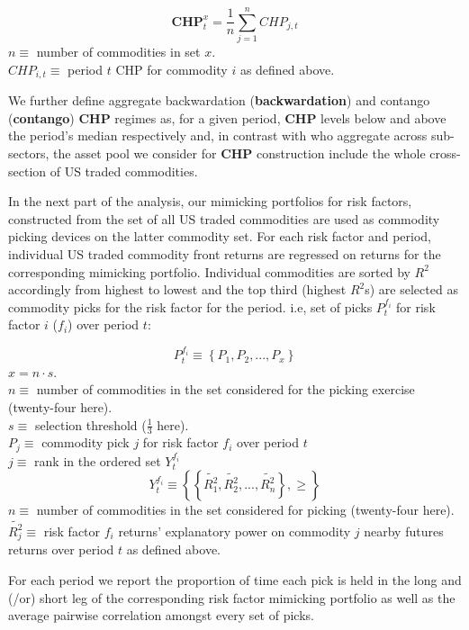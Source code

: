 \documentclass[
  authoryear,
  preprint,
  3p]{elsarticle}
\begin{document}
\[\mathbf{CHP}_{t}^{x}=\frac{1}{n}\sum_{j=1}^{n}CHP_{j,t}\] \(n\equiv\)
number of commodities in set \(x\).\\
\(CHP_{i,t}\equiv\) period \(t\) CHP for commodity \(i\) as defined
above.

\medskip

We further define aggregate backwardation (\textbf{backwardation}) and
contango (\textbf{contango}) \textbf{CHP} regimes as, for a given
period, \textbf{CHP} levels below and above the period's median
respectively and, in contrast with \citep{hong_what_2012} who aggregate
across sub-sectors, the asset pool we consider for \textbf{CHP}
construction include the whole cross-section of US traded commodities.

\medskip

In the next part of the analysis, our mimicking portfolios for risk
factors, constructed from the set of all US traded commodities are used
as commodity picking devices on the latter commodity set. For each risk
factor and period, individual US traded commodity front returns are
regressed on returns for the corresponding mimicking portfolio.
Individual commodities are sorted by \(R^{2}\) accordingly from highest
to lowest and the top third (highest \(R^{2}\)s) are selected as
commodity picks for the risk factor for the period. i.e, set of picks
\(P_{t}^{f_{i}}\) for risk factor \(i\) (\(f_{i}\)) over period \(t\):

\[P_{t}^{f_{i}}\equiv\left \{ P_{1}, P_{2}, ..., P_{x} \right \}\]
\(x = n \cdot s\).\\
\(n\equiv\) number of commodities in the set considered for the picking
exercise (twenty-four here).\\
\(s\equiv\) selection threshold (\(\frac{1}{3}\) here).\\
\(P_{j}\equiv\) commodity pick \(j\) for risk factor \(f_{i}\) over
period \(t\)\\
\(j\equiv\) rank in the ordered set \(Y_{t}^{f_{i}}\)\\
\[Y_{t}^{f_{i}}\equiv\left \{ \left \{ \tilde{R_{1}^{2}}, \tilde{R_{2}^{2}}, ..., \tilde{R_{n}^{2}} \right \}, \geq \right \}\]
\(n\equiv\) number of commodities in the set considered for picking
(twenty-four here).\\
\(\tilde{R_{j}^{2}}\equiv\) risk factor \(f_{i}\) returns' explanatory
power on commodity \(j\) nearby futures returns over period \(t\) as
defined above.

\medskip

For each period we report the proportion of time each pick is held in
the long and (/or) short leg of the corresponding risk factor mimicking
portfolio as well as the average pairwise correlation amongst every set
of picks.
\end{document}
